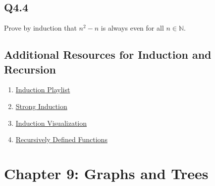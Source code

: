 \documentclass{article}
\begin{document}
\subsection*{Q4.4}
Prove by induction that $n^2-n$ is always even for all $n\in\mathbb{N}$.
\newpage

\subsection*{Additional Resources for Induction and Recursion}
\begin{enumerate}
    \item \href{https://www.youtube.com/watch?v=IdTaA6iz3Mo&list=PL5KkMZvBpo5CnkA4bi7l6W62VPoYRbOEk&index=1}{Induction Playlist}
    \item \href{https://www.youtube.com/watch?v=-vJhahLdmLI}{Strong Induction}
    \item \href{https://www.youtube.com/watch?v=5Hn8vUE3cBQ}{Induction Visualization}
    \item \href{https://www.youtube.com/watch?v=5RB4H_12wOs}{Recursively Defined Functions}
\end{enumerate}
\newpage
\section*{Chapter 9: Graphs and Trees}
\end{document}

